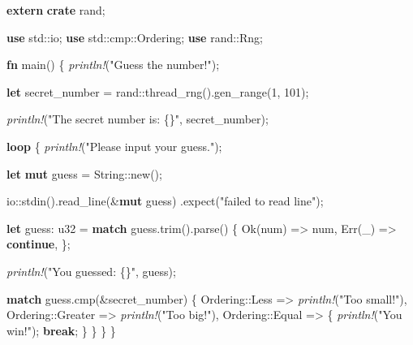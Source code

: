 \documentclass[a4paper,]{book}
\newenvironment{Shaded}{\begin{snugshade}}{\end{snugshade}}
\newcommand{\KeywordTok}[1]{\textcolor[rgb]{0.13,0.29,0.53}{\textbf{{#1}}}}
\newcommand{\DataTypeTok}[1]{\textcolor[rgb]{0.13,0.29,0.53}{{#1}}}
\newcommand{\DecValTok}[1]{\textcolor[rgb]{0.00,0.00,0.81}{{#1}}}
\newcommand{\ConstantTok}[1]{\textcolor[rgb]{0.00,0.00,0.00}{{#1}}}
\newcommand{\StringTok}[1]{\textcolor[rgb]{0.31,0.60,0.02}{{#1}}}
\newcommand{\PreprocessorTok}[1]{\textcolor[rgb]{0.56,0.35,0.01}{\textit{{#1}}}}
\newcommand{\NormalTok}[1]{{#1}}
\begin{document}
\begin{Shaded}
\begin{Highlighting}[]
\KeywordTok{extern} \KeywordTok{crate} \NormalTok{rand;}

\KeywordTok{use} \NormalTok{std::io;}
\KeywordTok{use} \NormalTok{std::cmp::Ordering;}
\KeywordTok{use} \NormalTok{rand::Rng;}

\KeywordTok{fn} \NormalTok{main() \{}
    \PreprocessorTok{println!}\NormalTok{(}\StringTok{"Guess the number!"}\NormalTok{);}

    \KeywordTok{let} \NormalTok{secret_number = rand::thread_rng().gen_range(}\DecValTok{1}\NormalTok{, }\DecValTok{101}\NormalTok{);}

    \PreprocessorTok{println!}\NormalTok{(}\StringTok{"The secret number is: \{\}"}\NormalTok{, secret_number);}

    \KeywordTok{loop} \NormalTok{\{}
        \PreprocessorTok{println!}\NormalTok{(}\StringTok{"Please input your guess."}\NormalTok{);}

        \KeywordTok{let} \KeywordTok{mut} \NormalTok{guess = }\DataTypeTok{String}\NormalTok{::new();}

        \NormalTok{io::stdin().read_line(&}\KeywordTok{mut} \NormalTok{guess)}
            \NormalTok{.expect(}\StringTok{"failed to read line"}\NormalTok{);}

        \KeywordTok{let} \NormalTok{guess: }\DataTypeTok{u32} \NormalTok{= }\KeywordTok{match} \NormalTok{guess.trim().parse() \{}
            \ConstantTok{Ok}\NormalTok{(num) => num,}
            \ConstantTok{Err}\NormalTok{(_) => }\KeywordTok{continue}\NormalTok{,}
        \NormalTok{\};}

        \PreprocessorTok{println!}\NormalTok{(}\StringTok{"You guessed: \{\}"}\NormalTok{, guess);}

        \KeywordTok{match} \NormalTok{guess.cmp(&secret_number) \{}
            \NormalTok{Ordering::Less    => }\PreprocessorTok{println!}\NormalTok{(}\StringTok{"Too small!"}\NormalTok{),}
            \NormalTok{Ordering::Greater => }\PreprocessorTok{println!}\NormalTok{(}\StringTok{"Too big!"}\NormalTok{),}
            \NormalTok{Ordering::Equal   => \{}
                \PreprocessorTok{println!}\NormalTok{(}\StringTok{"You win!"}\NormalTok{);}
                \KeywordTok{break}\NormalTok{;}
            \NormalTok{\}}
        \NormalTok{\}}
    \NormalTok{\}}
\NormalTok{\}}
\end{Highlighting}
\end{Shaded}
\end{document}

